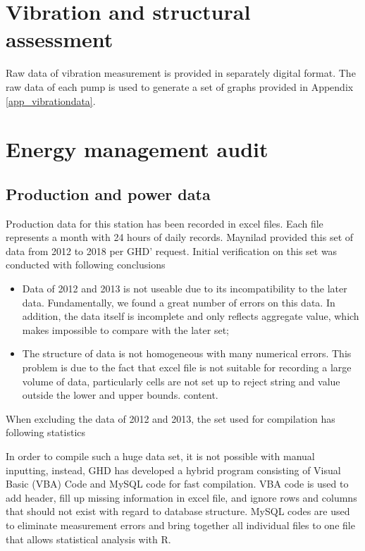 \section{Vibration and structural assessment}
\label{45}
Raw data of vibration measurement is provided in separately digital format. The raw data of each pump is used to generate a set of graphs provided in Appendix \ref{app_vibrationdata}.

\section{Energy management audit}
\label{46}

\subsection{Production and power data}
Production data for this station has been recorded in excel files. Each file represents a month with 24 hours of daily records. Maynilad provided this set of data from 2012 to 2018 per GHD' request. Initial verification on this set was conducted with following conclusions

\begin{itemize}
	\item Data of 2012 and 2013 is not useable due to its incompatibility to the later data. Fundamentally, we found a great number of errors on this data. In addition, the data itself is incomplete and only reflects aggregate value, which makes impossible to compare with the later set;
	\item The structure of data is not homogeneous with many numerical errors. This problem is due to the fact that excel file is not suitable for recording a large volume of data, particularly cells are not set up to reject string and value outside the lower and upper bounds.
	content.
\end{itemize}

When excluding the data of 2012 and 2013, the set used for compilation has following statistics

In order to compile such a huge data set, it is not possible with manual inputting, instead, GHD has developed a hybrid program consisting of Visual Basic (VBA) Code and MySQL code for fast compilation. VBA code is used to add header, fill up missing information in excel file, and ignore rows and columns that should not exist with regard to database structure. MySQL codes are used to eliminate measurement errors and bring together all individual files to one file that allows statistical analysis with R.
